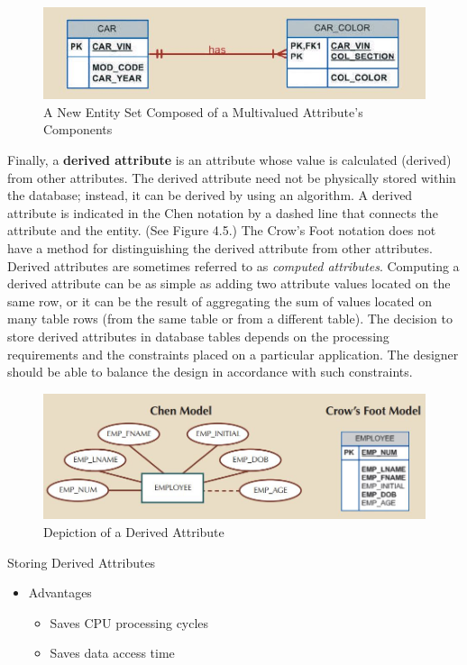 \documentclass[a4paper, 12pt, titlepage]{report}
\begin{document}
{\begin{enumerate}
\begin{figure}[H]
\centering
\includegraphics[scale=0.5]{Attr4}
\caption{A New Entity Set Composed of a Multivalued Attribute’s Components}
\end{figure}
\end{enumerate}
\noindent Finally, a \textbf{derived attribute} is an attribute whose value is calculated (derived) from other attributes. The derived attribute need not be physically stored within the database; instead, it can be derived by using an algorithm.  A derived attribute is indicated in the Chen notation by a dashed line that connects the attribute and the entity. (See Figure 4.5.) The Crow’s Foot notation does not have a method for distinguishing the derived attribute from other attributes. Derived attributes are sometimes referred to as \emph{computed attributes}. Computing a derived attribute can be as simple as adding two attribute values located on the same row, or it can be the result of aggregating the sum of values located on many table rows (from the same table or from a different table). The decision to store derived attributes in database tables depends on the processing requirements and the constraints placed on a particular application. The designer should be able to balance the design in accordance with such constraints. 
\begin{figure}[H]
\centering
\includegraphics[scale=0.5]{Attr5}
\caption{Depiction of a Derived Attribute}
\end{figure}
Storing Derived Attributes
\begin{itemize}
\item Advantages
\begin{itemize}
\item Saves CPU processing cycles
\item Saves data access time

\end{itemize}
\end{itemize}}
\end{document}
